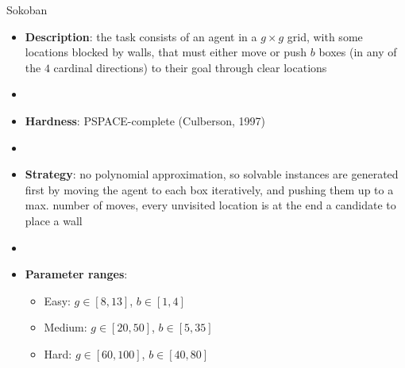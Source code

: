 \documentclass[aspectratio=169,xcolor=dvipsnames]{beamer}
\begin{document}
\begin{frame}{Sokoban}

    \begin{itemize}
        \item \textbf{Description}: the task consists of an agent in a $g\times g$ grid, with some locations blocked by walls, that must either move or push $b$ boxes (in any of the $4$ cardinal directions) to their goal through clear locations
        \item[]
        \item \textbf{Hardness}: PSPACE-complete (Culberson, 1997) %
        \item[]
        \item \textbf{Strategy}: no polynomial approximation, so solvable instances are generated first by moving the agent to each box iteratively, and pushing them up to a max. number of moves, every unvisited location is at the end a candidate to place a wall
        \item[]
        \item \textbf{Parameter ranges}:
        \begin{itemize}
            \item Easy: $g\in[8, 13]$, $b\in[1, 4]$
            \item Medium: $g\in[20, 50]$, $b\in [5,35]$
            \item Hard: $g\in[60, 100]$, $b\in[40,80]$
        \end{itemize}
    \end{itemize}

\end{frame}
\end{document}
